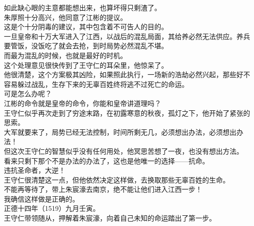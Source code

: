 \begin{multicols}{\theparacolNo}
如此缺心眼的主意都能想出来，也算坏得只剩渣了。\\

朱厚照十分高兴，他同意了江彬的提议。\\

这是个十分阴毒的建议，其中包含着不可告人的目的。\\

一旦皇帝和十万大军进入了江西，以战后的混乱局面，其给养必然无法供应。养兵要管饭，没饭吃了就会去抢，到时局势必然混乱不堪。\\

而最为混乱的时候，也就是最好的时机。\\

这个处理意见很快传到了王守仁的耳朵里，他惊呆了。\\

他很清楚，这个方案极其凶险，如果照此执行，一场新的浩劫必然兴起，那些好不容易躲过战乱，生存下来的无辜百姓终将逃不过死亡的命运。\\

可是怎么办呢？\\

江彬的命令就是皇帝的命令，你能和皇帝讲道理吗？\\

王守仁似乎再次走到了穷途末路，在初露寒意的秋夜，孤灯之下，他开始了紧张的思索。\\

大军就要来了，局势已经无法控制，时间所剩无几，必须想出办法，必须想出办法！\\

但这次王守仁的智慧似乎没有任何用处，他冥思苦想了一夜，也没有想出方法。\\

看来只剩下那个不是办法的办法了，这也是他唯一的选择——抗命。\\

违抗圣命者，大逆！\\

王守仁很清楚这一点，但他依然决定这样做，去换取那些无辜百姓的生命。\\

不能再等待了，带上朱宸濠去南京，绝不能让他们进入江西一步！\\

我确信这样做是正确的。\\

正德十四年（1519）九月壬寅。\\

王守仁带领随从，押解着朱宸濠，向着自己未知的命运踏出了第一步。\\


\end{multicols}
